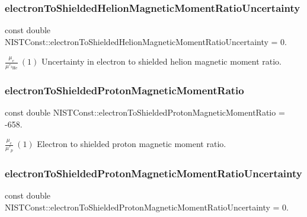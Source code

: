 \subsubsection{\texorpdfstring{electron\+To\+Shielded\+Helion\+Magnetic\+Moment\+Ratio\+Uncertainty}{electronToShieldedHelionMagneticMomentRatioUncertainty}}
{\footnotesize\ttfamily const double N\+I\+S\+T\+Const\+::electron\+To\+Shielded\+Helion\+Magnetic\+Moment\+Ratio\+Uncertainty = 0.}

$\frac{\mu_e}{\mu'_{^3\textrm{He}}} \ (1)$ Uncertainty in electron to shielded helion magnetic moment ratio. \mbox{\label{group___n_i_s_t_const-_electron_gacf35e7562c94178f6b182cff46131b6d}} 
\subsubsection{\texorpdfstring{electron\+To\+Shielded\+Proton\+Magnetic\+Moment\+Ratio}{electronToShieldedProtonMagneticMomentRatio}}
{\footnotesize\ttfamily const double N\+I\+S\+T\+Const\+::electron\+To\+Shielded\+Proton\+Magnetic\+Moment\+Ratio = -\/658.}

$\frac{\mu_e}{\mu'_p} \ (1)$ Electron to shielded proton magnetic moment ratio. \mbox{\label{group___n_i_s_t_const-_electron_ga334eecd21a41f4c879792b187b949946}} 
\subsubsection{\texorpdfstring{electron\+To\+Shielded\+Proton\+Magnetic\+Moment\+Ratio\+Uncertainty}{electronToShieldedProtonMagneticMomentRatioUncertainty}}
{\footnotesize\ttfamily const double N\+I\+S\+T\+Const\+::electron\+To\+Shielded\+Proton\+Magnetic\+Moment\+Ratio\+Uncertainty = 0.}

